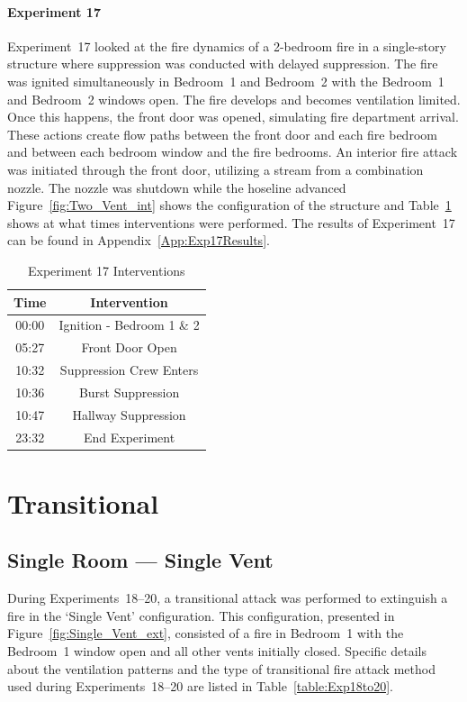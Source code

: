 \documentclass[12pt,oneside]{book}
\begin{document}
\paragraph{Experiment 17}
Experiment~17 looked at the fire dynamics of a 2-bedroom fire in a single-story structure where suppression was conducted with delayed suppression. The fire was ignited simultaneously in Bedroom~1 and Bedroom~2 with the Bedroom~1 and Bedroom~2 windows open. The fire develops and becomes ventilation limited. Once this happens, the front door was opened, simulating fire department arrival. These actions create flow paths between the front door and each fire bedroom and between each bedroom window and the fire bedrooms. An interior fire attack was initiated through the front door, utilizing a stream from a combination nozzle. The nozzle was shutdown while the hoseline advanced Figure~\ref{fig:Two_Vent_int} shows the configuration of the structure and Table~\ref{Table:Exp17Interventions} shows at what times interventions were performed. The results of Experiment~17 can be found in Appendix~\ref{App:Exp17Results}. 


\begin{table}[H]
	\centering
	\caption{Experiment 17 Interventions}
	\begin{tabular}{|c|c|} 
		\hline
		Time & Intervention \\ \hline \hline
		00:00 & Ignition - Bedroom 1 \& 2 \\ \hline
		05:27 & Front Door Open \\ \hline
		10:32 & Suppression Crew Enters\\ \hline
		10:36 & Burst Suppression \\ \hline 
		10:47 & Hallway Suppression \\ \hline
		23:32 & End Experiment\\ \hline
	\end{tabular}
	\label{Table:Exp17Interventions}
\end{table}

\clearpage

\section{Transitional}

\subsection{Single Room --- Single Vent}
During Experiments~18--20, a transitional attack was performed to extinguish a fire in the `Single Vent' configuration. This configuration, presented in Figure~\ref{fig:Single_Vent_ext}, consisted of a fire in Bedroom~1 with the Bedroom~1 window open and all other vents initially closed. Specific details about the ventilation patterns and the type of transitional fire attack method used during Experiments~18--20 are listed in Table~\ref{table:Exp18to20}. 
\end{document}
